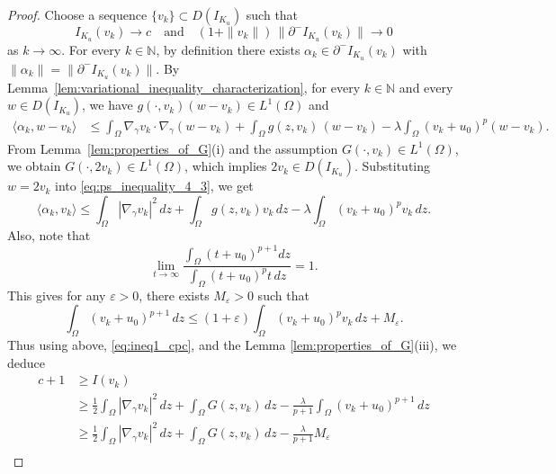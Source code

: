 \documentclass[11pt]{article}
\newcommand{\om} {\Omega}
\newcommand{\gradgr}{\nabla_{\gamma}}
\begin{document}
\begin{proof}
Choose a sequence $\{v_k\} \subset D(I_{K_u})$ such that
\[
I_{K_u}(v_k) \to c
\quad \text{and} \quad
(1 + \|v_k\|)\, \|\partial^- I_{K_u}(v_k)\| \to 0 
\]
as $k \to \infty$. For every $k \in \mathbb{N}$, by definition there exists $\alpha_k \in \partial^- I_{K_u}(v_k)$ with $\|\alpha_k\| = \|\partial^- I_{K_u}(v_k)\|$.
By Lemma~\ref{lem:variational_inequality_characterization}, for every $k \in \mathbb{N}$ and every $w \in D(I_{K_u})$, we have $g(\cdot, v_k)(w - v_k) \in L^1(\Omega)$ and
\begin{equation}
\label{eq:ps_inequality_4_3}
\begin{aligned}
\langle \alpha_k, w - v_k \rangle
&\le \int_{\Omega} \gradgr v_k \cdot \gradgr (w - v_k)
   + \int_{\Omega} g(z, v_k)\, (w - v_k) - \lambda \int_{\Omega} (v_k + u_{0})^p (w - v_k).
\end{aligned}
\end{equation}
From Lemma~\ref{lem:properties_of_G}(i) and the assumption $G(\cdot, v_k) \in L^1(\Omega)$, we obtain $G(\cdot, 2v_k) \in L^1(\Omega)$, which implies $2v_k \in D(I_{K_u})$. Substituting $w = 2v_k$ into \eqref{eq:ps_inequality_4_3}, we get
\begin{equation}\label{eq:ineq1_cpc}
\langle \alpha_k, v_k \rangle
\le \int_{\Omega} |\gradgr v_k|^2\, dz
+ \int_{\Omega} g(z, v_k) v_k\, dz
- \lambda \int_{\Omega} (v_k + u_{0})^p v_k\, dz .
\end{equation}
Also, note that 
\begin{equation*}
\lim_{t \to \infty} \frac{\int_{\om} (t + u_0)^{p+1} dz}{\int_{\om} (t+u_0)^p t \, dz} = 1.
\end{equation*}
This gives for any $\varepsilon > 0$, there exists $M_{\varepsilon} > 0$ such that 
\begin{equation*}
    \int_{\om} (v_k + u_0)^{p+1} \, dz \leq (1 + \varepsilon) \int_{\om} (v_k + u_0)^{p} v_k \, dz + M_{\varepsilon}.
\end{equation*}
Thus using above, \eqref{eq:ineq1_cpc}, and the Lemma \ref{lem:properties_of_G}(iii), we deduce
\begin{align*}
    c  + 1 & \geq I(v_k)  \\
    & \geq  \frac{1}{2} \int_{\Omega} |\gradgr v_k|^2\, dz
+ \int_{\Omega} G(z, v_k)\, dz
- \frac{\lambda}{p+1} \int_{\Omega} (v_k + u_{0})^{p+1}\, dz \\
 & \geq \frac{1}{2} \int_{\Omega} |\gradgr v_k|^2\, dz
+ \int_{\Omega} G(z, v_k)\, dz - \frac{\lambda}{p+1} M_\varepsilon \\

\end{align*}
\end{proof}
\end{document}
